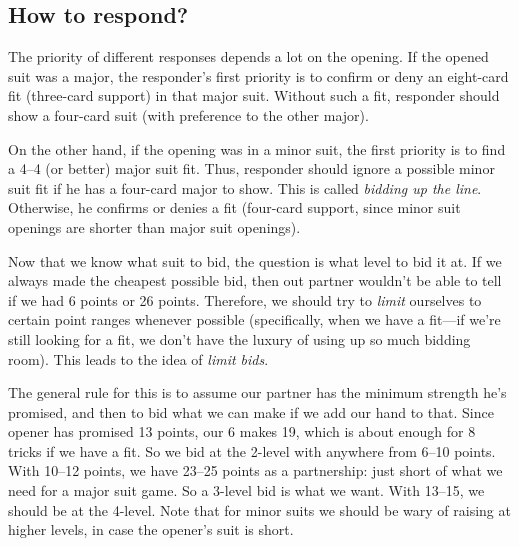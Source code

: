 \documentclass[oneside]{memoir}
\begin{document}
\subsection{How to respond?}
The priority of different responses depends a lot on the opening.  If
the opened suit was a major, the responder's first priority is to
confirm or deny an eight-card fit (three-card support) in that major
suit.  Without such a fit, responder should show a four-card suit
(with preference to the other major).

On the other hand, if the opening was in a minor suit, the first
priority is to find a 4--4 (or better) major suit fit.  Thus,
responder should ignore a possible minor suit fit if he has a
four-card major to show.  This is called \textit{bidding up the line}.
Otherwise, he confirms or denies a fit (four-card support, since minor
suit openings are shorter than major suit openings).


Now that we know what suit to bid, the question is what level to bid
it at.  If we always made the cheapest possible bid, then out partner
wouldn't be able to tell if we had 6 points or 26 points.  Therefore,
we should try to \textit{limit} ourselves to certain point ranges
whenever possible (specifically, when we have a fit---if we're still
looking for a fit, we don't have the luxury of using up so much
bidding room).  This leads to the idea of \emph{limit bids}.


The general rule for this is to assume our partner has
the minimum strength he's promised, and then to bid what we can make
if we add our hand to that.  Since opener has promised 13 points, our
6 makes 19, which is about enough for 8 tricks if we have a fit.  So we
bid at the 2-level with anywhere from 6--10 points.  With 10--12 points,
we have 23--25 points as a partnership: just short of what we need for
a major suit game.  So a 3-level bid is what we want.  With 13--15, we
should be at the 4-level.  Note that for minor suits we should be wary
of raising at higher levels, in case the opener's suit is short.
\end{document}
